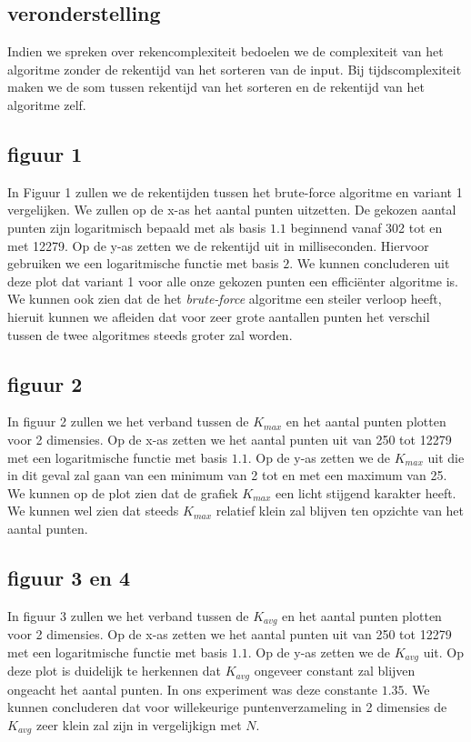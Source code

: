 \documentclass[12pt]{article}
\begin{document}
\subsection{veronderstelling}
Indien we spreken over rekencomplexiteit bedoelen we de complexiteit van het algoritme zonder de rekentijd van het sorteren van de input.
Bij tijdscomplexiteit maken we de som tussen rekentijd van het sorteren en de rekentijd van het algoritme zelf.

\subsection{figuur 1}
In Figuur 1 zullen we de rekentijden tussen het brute-force algoritme en variant 1 vergelijken.
We zullen op de x-as het aantal punten uitzetten.
De gekozen aantal punten zijn logaritmisch bepaald met als basis $1.1$ beginnend vanaf 302 tot en met 12279.
Op de y-as zetten we de rekentijd uit in milliseconden. Hiervoor gebruiken we een logaritmische functie met basis $2$.
We kunnen concluderen uit deze plot dat variant 1 voor alle onze gekozen punten een efficiënter algoritme is.
We kunnen ook zien dat de het \textit{brute-force} algoritme een steiler verloop heeft, hieruit kunnen we afleiden dat voor zeer grote aantallen punten het verschil tussen de twee algoritmes steeds groter zal worden.

\subsection{figuur 2}
In figuur 2 zullen we het verband tussen de $K_{max}$ en het aantal punten plotten voor 2 dimensies.
Op de x-as zetten we het aantal punten uit van 250 tot 12279 met een logaritmische functie met basis $1.1$.
Op de y-as zetten we de $K_{max}$ uit die in dit geval zal gaan van een minimum van 2 tot en met een maximum van 25.
We kunnen op de plot zien dat de grafiek $K_{max}$ een licht stijgend karakter heeft.
We kunnen wel zien dat steeds $K_{max}$ relatief klein zal blijven ten opzichte van het aantal punten.
\newpage
\subsection{figuur 3 en 4}
In figuur 3 zullen we het verband tussen de $K_{avg}$ en het aantal punten plotten voor 2 dimensies.
Op de x-as zetten we het aantal punten uit van 250 tot 12279 met een logaritmische functie met basis $1.1$.
Op de y-as zetten we de $K_{avg}$ uit.
Op deze plot is duidelijk te herkennen dat $K_{avg}$ ongeveer constant zal blijven ongeacht het aantal punten.
In ons experiment was deze constante $1.35$.
We kunnen concluderen dat voor willekeurige puntenverzameling in 2 dimensies de $K_{avg}$ zeer klein zal zijn in vergelijkign met $N$.
\end{document}
